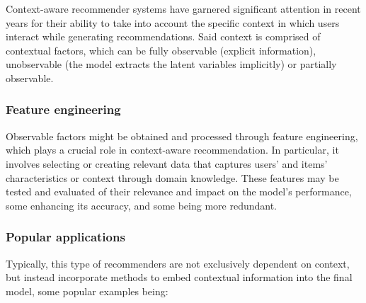 Context-aware recommender systems have garnered significant attention in recent years for their ability to take into account the specific context in which users interact while generating recommendations. Said context is comprised of contextual factors, which can be fully observable (explicit information), unobservable (the model extracts the latent variables implicitly) or partially observable.

\subsubsection{Feature engineering}

Observable factors might be obtained and processed through feature engineering, which plays a crucial role in context-aware recommendation. In particular, it involves selecting or creating relevant data that captures users' and items' characteristics or context through domain knowledge. These features may be tested and evaluated of their relevance and impact on the model's performance, some enhancing its accuracy, and some being more redundant.

\subsubsection{Popular applications}

Typically, this type of recommenders are not exclusively dependent on context, but instead incorporate methods to embed contextual information into the final model, some popular examples being:

